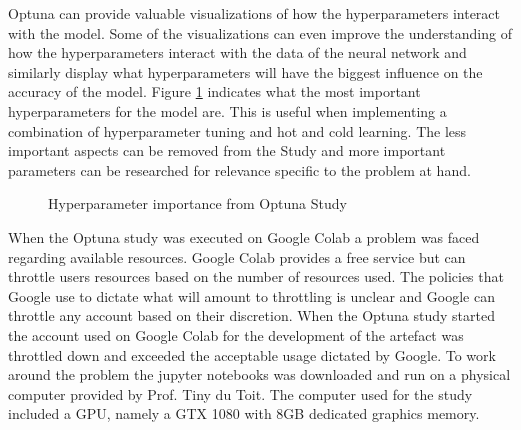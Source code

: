 Optuna can provide valuable visualizations of how the hyperparameters interact with the model. Some of the visualizations can even improve the understanding of how the hyperparameters interact with the data of the neural network and similarly display what hyperparameters will have the biggest influence on the accuracy of the model. Figure \ref{fig:optparam} indicates what the most important hyperparameters for the model are. This is useful when implementing a combination of hyperparameter tuning and hot and cold learning. The less important aspects can be removed from the Study and more important parameters can be researched for relevance specific to the problem at hand.

\begin{figure}[H]%
\centering
{}%
\caption{Hyperparameter importance from Optuna Study}%
\label{fig:optparam}%
\end{figure}


When the Optuna study was executed on Google Colab a problem was faced regarding available resources. Google Colab provides a free service but can throttle users resources based on the number of resources used. The policies that Google use to dictate what will amount to throttling is unclear and Google can throttle any account based on their discretion. When the Optuna study started the account used on Google Colab for the development of the artefact was throttled down and exceeded the acceptable usage dictated by Google. To work around the problem the jupyter notebooks was downloaded and run on a physical computer provided by Prof. Tiny du Toit. The computer used for the study included a GPU, namely a GTX 1080 with 8GB dedicated graphics memory.

